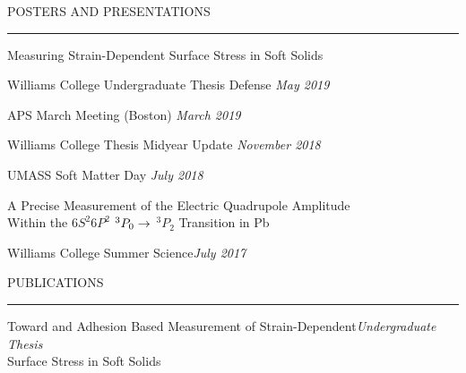 \documentclass{resume} %
\renewenvironment{rSection}[1]{
	\sectionskip
	\textcolor{RoyalPurple}{\MakeUppercase{#1}}
	\sectionlineskip
	\hrule
	\begin{list}{}{
			\setlength{\leftmargin}{1.5em}
		}
		\item[]
	}{
	\end{list}
}
\begin{document}
\begin{rSection}{Posters and Presentations} \itemsep -2pt
		\begin{rSubsection}{Measuring Strain-Dependent Surface Stress in Soft Solids}{}{}{}
			\item {Williams College Undergraduate Thesis Defense} \hfill {\em May 2019}
			\item {APS March Meeting (Boston)} \hfill {\em March 2019}
			\item {Williams College Thesis Midyear Update} \hfill {\em November 2018}
			\item {UMASS Soft Matter Day} \hfill {\em July 2018}
		\end{rSubsection}

			\begin{rSubsection}{ A Precise Measurement of the Electric Quadrupole Amplitude \\ Within the \textbf{${6S^2 6P^2}$ \space ${^3 P_0 \space \rightarrow} \space$ ${^3P_2}$} Transition in Pb}{}{}{}

			\item {Williams College Summer Science\hfill}{\em July 2017}

			\end{rSubsection}
\end{rSection}

\pagebreak
\begin{rSection}{Publications} \itemsep -2pt
	\item {Toward and Adhesion Based Measurement of Strain-Dependent}\hfill {\em Undergraduate Thesis}\\ Surface Stress in Soft Solids
\end{rSection}
\end{document}
